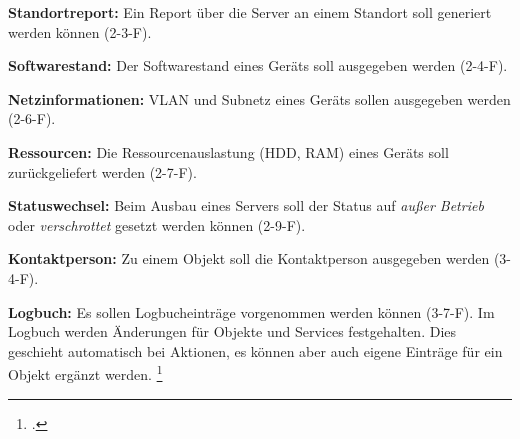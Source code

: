 \textbf{Standortreport:} Ein Report über die Server an einem Standort soll generiert werden können (2-3-F).

\textbf{Softwarestand:} Der Softwarestand eines Geräts soll ausgegeben werden (2-4-F).

\textbf{Netzinformationen:} VLAN und Subnetz eines Geräts sollen ausgegeben werden (2-6-F).

\textbf{Ressourcen: } Die Ressourcenauslastung (HDD, RAM) eines Geräts soll zurückgeliefert werden (2-7-F).

\textbf{Statuswechsel:} Beim Ausbau eines Servers soll der Status auf \textit{außer Betrieb} oder \textit{verschrottet} gesetzt werden können (2-9-F).

\textbf{Kontaktperson:} Zu einem Objekt soll die Kontaktperson ausgegeben werden (3-4-F).

\textbf{Logbuch:} Es sollen Logbucheinträge vorgenommen werden können (3-7-F). Im Logbuch werden Änderungen für Objekte und Services festgehalten. Dies geschieht automatisch bei Aktionen, es können aber auch eigene Einträge für ein Objekt ergänzt werden.
\footcite[Vgl.][o. \pno]{idoit_2019_logbuch}


